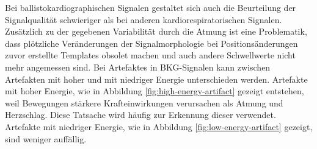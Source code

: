 	Bei ballistokardiographischen Signalen gestaltet sich auch die Beurteilung der Signalqualität schwieriger als bei anderen kardiorespiratorischen Signalen. Zusätzlich zu der gegebenen Variabilität durch die Atmung ist eine Problematik, dass plötzliche Veränderungen der Signalmorphologie bei Positionsänderungen zuvor erstellte Templates obsolet machen und auch andere Schwellwerte nicht mehr angemessen sind. Bei Artefaktes in \ac{BKG}-Signalen kann zwischen Artefakten mit hoher und mit niedriger Energie unterschieden werden. Artefakte mit hoher Energie, wie in Abbildung \ref{fig:high-energy-artifact} gezeigt entstehen, weil Bewegungen stärkere Krafteinwirkungen verursachen als Atmung und Herzschlag. Diese Tatsache wird häufig zur Erkennung dieser verwendet. Artefakte mit niedriger Energie, wie in Abbildung \ref{fig:low-energy-artifact} gezeigt, sind weniger auffällig.
	

